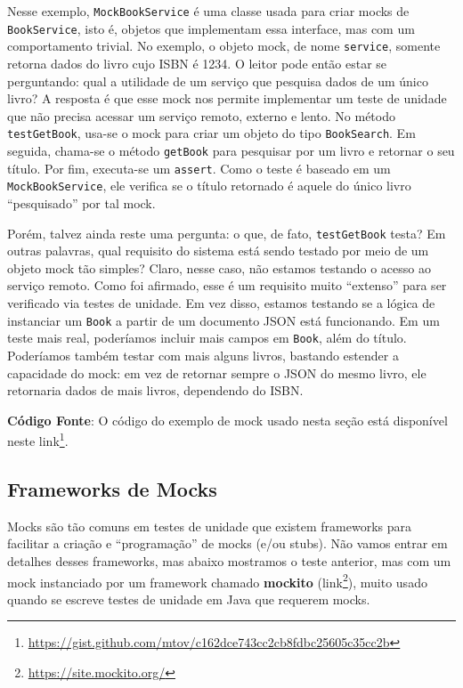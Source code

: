 \documentclass[
  11pt,
  twoside]{book}
\newcommand{\passthrough}[1]{#1}
\DeclareRobustCommand{\href}[2]{#2\footnote{\url{#1}}}
\begin{document}
Nesse exemplo, \passthrough{\lstinline!MockBookService!} é uma classe
usada para criar mocks de \passthrough{\lstinline!BookService!}, isto é,
objetos que implementam essa interface, mas com um comportamento
trivial. No exemplo, o objeto mock, de nome
\passthrough{\lstinline!service!}, somente retorna dados do livro cujo
ISBN é 1234. O leitor pode então estar se perguntando: qual a utilidade
de um serviço que pesquisa dados de um único livro? A resposta é que
esse mock nos permite implementar um teste de unidade que não precisa
acessar um serviço remoto, externo e lento. No método
\passthrough{\lstinline!testGetBook!}, usa-se o mock para criar um
objeto do tipo \passthrough{\lstinline!BookSearch!}. Em seguida,
chama-se o método \passthrough{\lstinline!getBook!} para pesquisar por
um livro e retornar o seu título. Por fim, executa-se um
\passthrough{\lstinline!assert!}. Como o teste é baseado em um
\passthrough{\lstinline!MockBookService!}, ele verifica se o título
retornado é aquele do único livro ``pesquisado'' por tal mock.

Porém, talvez ainda reste uma pergunta: o que, de fato,
\passthrough{\lstinline!testGetBook!} testa? Em outras palavras, qual
requisito do sistema está sendo testado por meio de um objeto mock tão
simples? Claro, nesse caso, não estamos testando o acesso ao serviço
remoto. Como foi afirmado, esse é um requisito muito ``extenso'' para
ser verificado via testes de unidade. Em vez disso, estamos testando se
a lógica de instanciar um \passthrough{\lstinline!Book!} a partir de um
documento JSON está funcionando. Em um teste mais real, poderíamos
incluir mais campos em \passthrough{\lstinline!Book!}, além do título.
Poderíamos também testar com mais alguns livros, bastando estender a
capacidade do mock: em vez de retornar sempre o JSON do mesmo livro, ele
retornaria dados de mais livros, dependendo do ISBN.

\textbf{Código Fonte}: O código do exemplo de mock usado nesta seção
está disponível neste
\href{https://gist.github.com/mtov/c162dce743cc2cb8fdbc25605c35cc2b}{link}.

\hypertarget{frameworks-de-mocks}{%
\subsection{Frameworks de Mocks}\label{frameworks-de-mocks}}

  

Mocks são tão comuns em testes de unidade que existem frameworks para
facilitar a criação e ``programação'' de mocks (e/ou stubs). Não vamos
entrar em detalhes desses frameworks, mas abaixo mostramos o teste
anterior, mas com um mock instanciado por um framework chamado
\textbf{mockito} (\href{https://site.mockito.org/}{link}), muito usado
quando se escreve testes de unidade em Java que requerem mocks.
\end{document}
